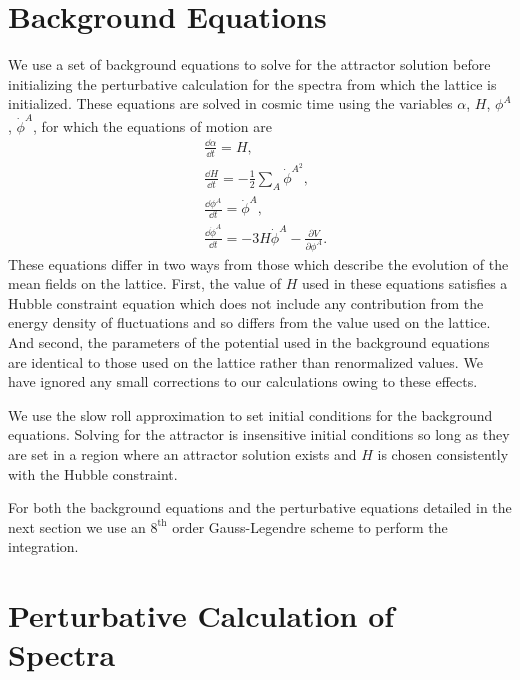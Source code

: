 

\section{Background Equations}
We use a set of background equations to solve for the attractor solution before initializing the perturbative calculation for the spectra from which the lattice is initialized. These equations are solved in cosmic time using the variables $\alpha$, $H$, $\phi^A$, $\dot{\phi}^A$, for which the equations of motion are
\begin{align}
  & \frac{\dd\alpha}{\dd t} = H, \\
  & \frac{\dd H}{\dd t} = -\frac{1}{2}\sum_A\dot{\phi}^{A^2}, \\
  & \frac{\dd\phi^A}{\dd t} = \dot{\phi}^A, \\
  & \frac{\dd\dot{\phi}^A}{\dd t} = -3H\dot{\phi}^A - \frac{\partial V}{\partial\phi^A}.
\end{align}
These equations differ in two ways from those which describe the evolution of the mean fields on the lattice. First, the value of $H$ used in these equations satisfies a Hubble constraint equation which does not include any contribution from the energy density of fluctuations and so differs from the value used on the lattice. And second, the parameters of the potential used in the background equations are identical to those used on the lattice rather than renormalized values. We have ignored any small corrections to our calculations owing to these effects.

We use the slow roll approximation to set initial conditions for the background equations. Solving for the attractor is insensitive initial conditions so long as they are set in a region where an attractor solution exists and $H$ is chosen consistently with the Hubble constraint. 

For both the background equations and the perturbative equations detailed in the next section we use an $8^\mathrm{th}$ order Gauss-Legendre scheme to perform the integration.

\section{Perturbative Calculation of Spectra}

